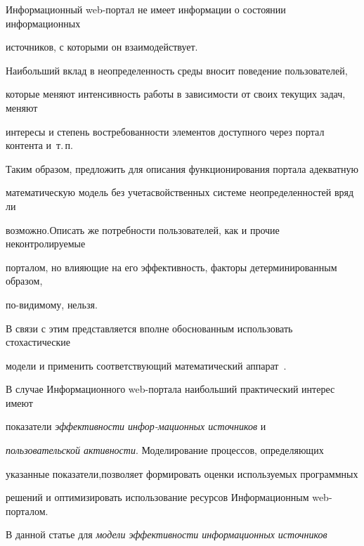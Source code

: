 Информационный web-портал не имеет информации о состоянии информационных 


источников, с которыми он взаимодействует.


      


      Наибольший вклад в неопределенность среды вносит поведение пользователей, 


которые меняют интенсивность работы в зависимости от своих текущих задач, меняют 


интересы и степень востребованности элементов доступного через портал контента и~т.\,п. 


Таким образом, предложить для описания функционирования портала адекватную 


математическую модель без учета\linebreak свойственных системе неопределенностей вряд ли 


возможно.\linebreak Описать же потребности пользователей, как и прочие неконтролируемые 


порталом, но влияющие на его эффективность, факторы детерминированным образом, 


по-видимому, нельзя.


      


      В связи с этим представляется вполне обоснованным использовать стохастические 


модели и применить соответствующий математический аппарат~\cite{3-8, 4-8}.


      


      В случае Информационного web-портала наибольший практический интерес имеют 


показатели \textit{эффективности ин\-фор-\linebreak мационных источников} и 


\textit{пользовательской активности}. Моделирование процессов, определяющих 


указанные показатели,\linebreak позволяет формировать оценки используемых программных 


решений и оптимизировать использование ресурсов Информационным web-порталом.


      


      В данной статье для \textit{модели эффективности информационных источников} 


